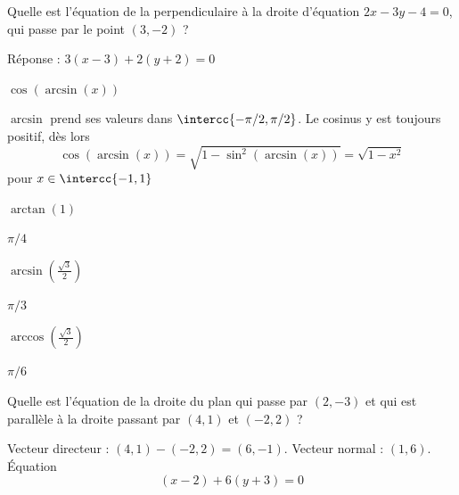 \begin{frame}
  \begin{enonce}
  Quelle est l'équation de la perpendiculaire \`a la droite d'équation $2x-3y-4=0$, qui passe par le point $(3,-2)$ ?
\end{enonce}

\begin{answer}
Réponse : \(3(x-3) + 2(y+2) = 0\)
\end{answer}
\end{frame}
\begin{frame}
  \begin{enonce}
\(\cos(\arcsin(x))\)
\end{enonce}
\begin{answer}
$\arcsin$ prend ses valeurs dans \(\intercc{-\pi/2, \pi/2}\). Le cosinus y est toujours positif, dès lors
\begin{equation*}
  \cos(\arcsin(x)) = \sqrt{1 - \sin^{2}(\arcsin(x))} = \sqrt{1 - x^{2}}
\end{equation*}
pour \(x \in \intercc{-1,1}\)
\end{answer}
\end{frame}
\begin{frame}
  \begin{enonce}
    \(\arctan(1)\)
  \end{enonce}

  \begin{answer}
\(\pi/4\)
\end{answer}
\end{frame}
\begin{frame}
  \begin{enonce}
\(\arcsin(\frac{\sqrt{3}}{2})\)
\end{enonce}

\begin{answer}
\(\pi/3\)
\end{answer}
\end{frame}
\begin{frame}
  \begin{enonce}
    \(\arccos(\frac{\sqrt{3}}{2})\)
  \end{enonce}

  \begin{answer}
 \(\pi/6\)
\end{answer}

\end{frame}
\begin{frame}
  \begin{enonce}
Quelle est l'équation de la droite du plan qui passe par $(2,-3)$ et qui est parall\`ele \`a la droite passant par $(4,1)$ et $(-2,2)$ ?
\end{enonce}

\begin{answer}
Vecteur directeur : \((4,1)- (-2,2) = (6,-1)\). Vecteur normal : \((1,6)\). Équation
\begin{equation*}
  (x-2) + 6 (y+3) = 0
\end{equation*}
\end{answer}
\end{frame}
